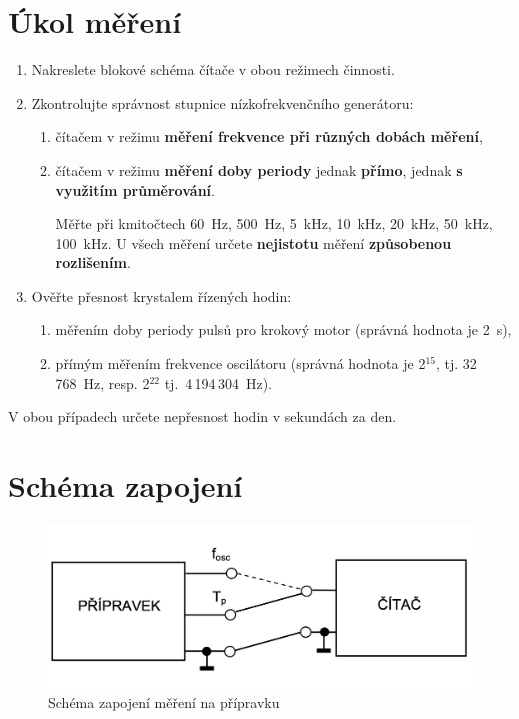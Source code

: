 \documentclass[a4paper,12pt]{article}   %
\newcommand{\texp}[1]{$^\textrm{#1}$}
\begin{document}
\section{Úkol měření}
\label{chap:zadani}
\begin{enumerate}
    \item Nakreslete blokové schéma čítače v obou režimech činnosti.
    \item Zkontrolujte správnost stupnice nízkofrekvenčního generátoru:
    \begin{enumerate}[label=\alph*)]
        \item čítačem v režimu \textbf{měření frekvence při různých dobách měření},
        \item čítačem v režimu \textbf{měření doby periody} jednak \textbf{přímo}, jednak \textbf{s využitím průměrování}.

        Měřte při kmitočtech 60~Hz, 500~Hz, 5~kHz, 10~kHz, 20~kHz, 50~kHz, 100~kHz. U všech měření určete \textbf{nejistotu} měření \textbf{způsobenou rozlišením}.
    \end{enumerate}
    \item Ověřte přesnost krystalem řízených hodin:
    \begin{enumerate}[label=\alph*)]
        \item měřením doby periody pulsů pro krokový motor (správná hodnota je 2~s),
        \item přímým měřením frekvence oscilátoru (správná hodnota je 2\texp{15}, tj. 32\,768~Hz, resp. 2\texp{22} tj.~4\,194\,304~Hz).
    \end{enumerate}
\end{enumerate}
V obou případech určete nepřesnost hodin v sekundách za den.



\section{Schéma zapojení}
\label{schema_zapojeni}
\begin{figure}[h!]
  \centering
  \includegraphics[width=.6\textwidth]{schema.png}
  \caption{Schéma zapojení měření na přípravku}
  \label{fig:schema}
\end{figure}
\end{document}

